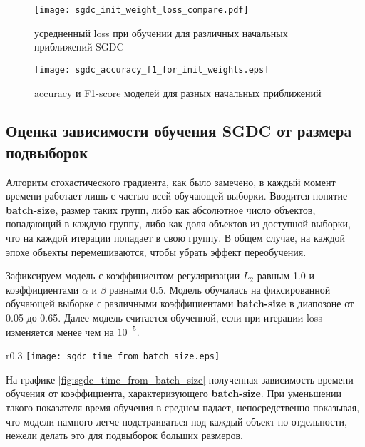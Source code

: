 \documentclass{article}
\begin{document}
    \begin{figure}[t]
        \centering
        \texttt{[image: sgdc\_init\_weight\_loss\_compare.pdf]}
        \caption{усредненный loss при обучении для различных начальных приближений SGDC}
        \label{fig:sgdc_init_weight_loss_compare}
    \end{figure}


    \begin{figure}[h]
        \centering
        \texttt{[image: sgdc\_accuracy\_f1\_for\_init\_weights.eps]}
        \caption{accuracy и F1-score моделей для разных начальных приближений}
        \label{fig:sgdc_accuracy_f1_for_init_weights}
    \end{figure}


    \subsection{Оценка зависимости обучения SGDC от размера подвыборок}

        Алгоритм стохастического градиента, как было замечено, в каждый момент времени работает лишь с частью всей обучающей выборки. Вводится понятие \textbf{batch-size}, размер таких групп, либо как абсолютное число объектов, попадающий в каждую группу, либо как доля объектов из доступной выборки, что на каждой итерации попадает в свою группу. В общем случае, на каждой эпохе объекты перемешиваются, чтобы убрать эффект переобучения. 


        Зафиксируем модель с коэффициентом регуляризации $L_2$ равным 1.0 и коэффициентами $\alpha$ и $\beta$ равными 0.5. Модель обучалась на фиксированной обучающей выборке с различными коэффициентами \textbf{batch-size} в диапозоне от 0.05 до 0.65. Далее модель считается обученной, если при итерации loss изменяется менее чем на ${10}^{-5}$. 

\begin{wrapfigure}{r}{0.3\textwidth}
    \centering
    \texttt{[image: sgdc\_time\_from\_batch\_size.eps]}
    \caption{Общая зависимость времени обучения от \textbf{batch-size}}
    \label{fig:sgdc_time_from_batch_size}
\end{wrapfigure}

        На графике \ref{fig:sgdc_time_from_batch_size} полученная зависимость времени обучения от коэффициента, характеризующего \textbf{batch-size}. При уменьшении такого показателя время обучения в среднем падает, непосредственно показывая, что модели намного легче подстраиваться под каждый объект по отдельности, нежели делать это для подвыборок больших размеров.
\end{document}
